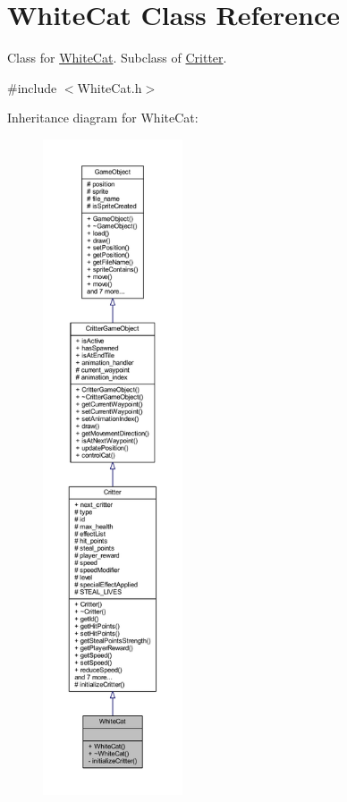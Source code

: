 \hypertarget{class_white_cat}{\section{White\+Cat Class Reference}
\label{class_white_cat}
}


Class for \hyperlink{class_white_cat}{White\+Cat}. Subclass of \hyperlink{class_critter}{Critter}.  




{\ttfamily \#include $<$White\+Cat.\+h$>$}



Inheritance diagram for White\+Cat\+:\nopagebreak
\begin{figure}[H]
\begin{center}
\leavevmode
\includegraphics[height=550pt]{class_white_cat__inherit__graph}
\end{center}
\end{figure}


